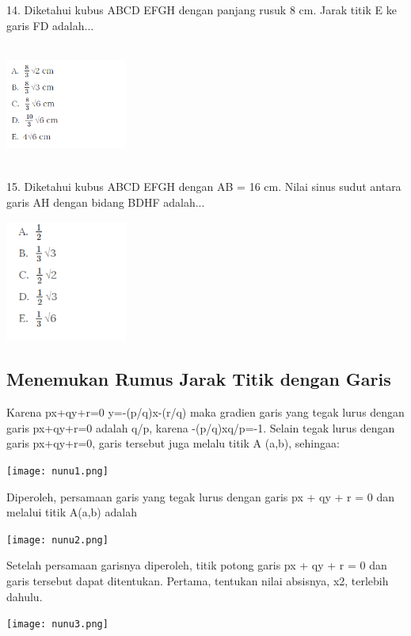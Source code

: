 \documentclass[11pt,fleqn]{book} %
\begin{document}
14. Diketahui kubus ABCD EFGH dengan panjang rusuk 8 cm. Jarak titik E ke garis FD adalah...

\includegraphics[width = 4cm, height= 4cm]{Pictures/gi42.png}

15. Diketahui kubus ABCD EFGH dengan AB = 16 cm. Nilai sinus sudut antara garis AH dengan bidang BDHF adalah...

\includegraphics[width = 4cm, height= 4cm]{Pictures/gi43.png}

\subsection{Menemukan Rumus Jarak Titik dengan Garis}

Karena px+qy+r=0 y=-(p/q)x-(r/q) maka gradien garis yang tegak lurus dengan garis px+qy+r=0 adalah q/p, karena -(p/q)xq/p=-1. Selain tegak lurus dengan garis px+qy+r=0, garis tersebut juga melalu titik A (a,b), sehingaa:

\begin{center}
\texttt{[image: nunu1.png]}
\end{center}

Diperoleh, persamaan garis yang tegak lurus dengan garis px + qy + r = 0 dan melalui titik A(a,b) adalah

\begin{center}
\texttt{[image: nunu2.png]}
\end{center}

Setelah persamaan garisnya diperoleh, titik potong garis px + qy + r = 0 dan garis tersebut dapat ditentukan. Pertama, tentukan nilai absisnya, x2,  terlebih dahulu.

\begin{center}
\texttt{[image: nunu3.png]}
\end{center}
\end{document}
